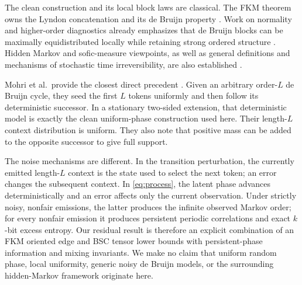 \documentclass[11pt,a4paper]{amsart}
\theoremstyle{definition}
\theoremstyle{remark}
\begin{document}
The clean construction and its local block laws are classical.  The FKM
theorem owns the Lyndon concatenation and its de Bruijn property
\cite{FredricksenMaiorana1978,AmramEtAl2025}.  Work on normality and
higher-order diagnostics already emphasizes that de Bruijn blocks can be
maximally equidistributed locally while retaining strong ordered structure
\cite{PincusSinger2014}.  Hidden Markov and sofic-measure viewpoints, as well
as general definitions and mechanisms of stochastic time irreversibility,
are also established \cite{BoylePetersen2010,EllisonEtAl2011}.

Mohri et al.\ provide the closest direct precedent
\cite[Sec.~4.1]{MohriEtAl2026}.  Given an arbitrary order-$L$ de Bruijn
cycle, they seed the first $L$ tokens uniformly and then follow its
deterministic successor.  In a stationary two-sided extension, that
deterministic model is exactly the clean uniform-phase construction used
here.  Their length-$L$ context distribution is uniform.  They also note
that positive mass can be added to the opposite successor to give full
support.

The noise mechanisms are different.  In the transition perturbation, the
currently emitted length-$L$ context is the state used to select the next
token; an error changes the subsequent context.  In \eqref{eq:process}, the
latent phase advances deterministically and an error affects only the
current observation.  Under strictly noisy, nonfair emissions, the latter
produces the infinite observed Markov order; for every nonfair emission it
produces persistent periodic correlations and exact $k$-bit excess entropy.
Our residual result is therefore an explicit combination of
an FKM oriented edge and BSC tensor lower bounds with persistent-phase
information and mixing invariants.
We make no claim that uniform random phase, local uniformity, generic noisy
de Bruijn models, or the surrounding hidden-Markov framework originate
here.
\end{document}
